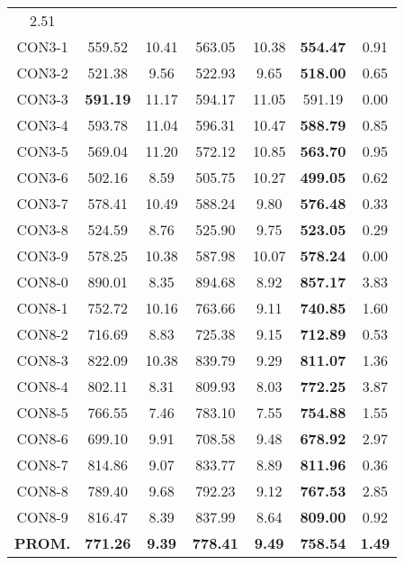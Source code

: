 \begin{table}[ht]
\begin{tabular}{c c c c c c c}
2.51\\CON3-1 & 559.52 & 10.41 & 
563.05 & 10.38 & \bf{554.47} & 
0.91\\CON3-2 & 521.38 & 9.56 & 
522.93 & 9.65 & \bf{518.00} & 
0.65\\CON3-3 & \bf{591.19} & 11.17 & 
594.17 & 11.05 & 591.19 & 0.00\\
CON3-4 & 593.78 & 11.04 & 
596.31 & 10.47 & \bf{588.79} & 
0.85\\CON3-5 & 569.04 & 11.20 & 
572.12 & 10.85 & \bf{563.70} & 
0.95\\CON3-6 & 502.16 & 8.59 & 
505.75 & 10.27 & \bf{499.05} & 
0.62\\CON3-7 & 578.41 & 10.49 & 
588.24 & 9.80 & \bf{576.48} & 
0.33\\CON3-8 & 524.59 & 8.76 & 
525.90 & 9.75 & \bf{523.05} & 
0.29\\CON3-9 & 578.25 & 10.38 & 
587.98 & 10.07 & \bf{578.24} & 
0.00\\CON8-0 & 890.01 & 8.35 & 
894.68 & 8.92 & \bf{857.17} & 
3.83\\CON8-1 & 752.72 & 10.16 & 
763.66 & 9.11 & \bf{740.85} & 
1.60\\CON8-2 & 716.69 & 8.83 & 
725.38 & 9.15 & \bf{712.89} & 
0.53\\CON8-3 & 822.09 & 10.38 & 
839.79 & 9.29 & \bf{811.07} & 
1.36\\CON8-4 & 802.11 & 8.31 & 
809.93 & 8.03 & \bf{772.25} & 
3.87\\CON8-5 & 766.55 & 7.46 & 
783.10 & 7.55 & \bf{754.88} & 
1.55\\CON8-6 & 699.10 & 9.91 & 
708.58 & 9.48 & \bf{678.92} & 
2.97\\CON8-7 & 814.86 & 9.07 & 
833.77 & 8.89 & \bf{811.96} & 
0.36\\CON8-8 & 789.40 & 9.68 & 
792.23 & 9.12 & \bf{767.53} & 
2.85\\CON8-9 & 816.47 & 8.39 & 
837.99 & 8.64 & \bf{809.00} & 
0.92\\\bf{PROM.} & 
\bf{771.26} & \bf{9.39} & \bf{778.41} & \bf{9.49} & \bf{758.54} & \bf{1.49}\\[1ex]\hline
\end{tabular}
\label{table:nonlin}
\end{table} \clearpage
